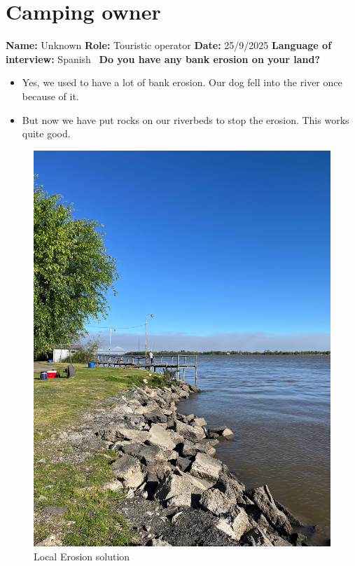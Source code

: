 \section{Camping owner}
\textbf{Name:} Unknown \newline
\textbf{Role:} Touristic operator \newline
\textbf{Date:} 25/9/2025 \newline
\textbf{Language of interview:} Spanish \newline \newline\
\textbf{Do you have any bank erosion on your land?}
\begin{itemize}
    \item Yes, we used to have a lot of bank erosion. Our dog fell into the river once because of it. 
    \item But now we have put rocks on our riverbeds to stop the erosion. This works quite good.
\end{itemize}

\begin{figure}[H]
    \centering
    \includegraphics[width=0.5\linewidth]{figures/appendixE/rocks.jpg}
    \caption{Local Erosion solution }
    \label{fig:placeholder}
\end{figure}
